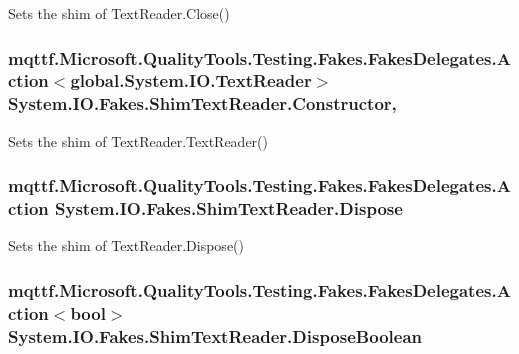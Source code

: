 Sets the shim of Text\-Reader.\-Close()

\hypertarget{class_system_1_1_i_o_1_1_fakes_1_1_shim_text_reader_a89c4d79eb1dcfe91f73276d137d9e68d}{
\subsubsection[{Constructor}]{\setlength{\rightskip}{0pt plus 5cm}mqttf.\-Microsoft.\-Quality\-Tools.\-Testing.\-Fakes.\-Fakes\-Delegates.\-Action$<$global.\-System.\-I\-O.\-Text\-Reader$>$ System.\-I\-O.\-Fakes.\-Shim\-Text\-Reader.\-Constructor\hspace{0.3cm}{\ttfamily [static]}, {\ttfamily [set]}}}\label{class_system_1_1_i_o_1_1_fakes_1_1_shim_text_reader_a89c4d79eb1dcfe91f73276d137d9e68d}


Sets the shim of Text\-Reader.\-Text\-Reader()

\hypertarget{class_system_1_1_i_o_1_1_fakes_1_1_shim_text_reader_ada6a130756159fc9f4e7c2239f70b67f}{
\subsubsection[{Dispose}]{\setlength{\rightskip}{0pt plus 5cm}mqttf.\-Microsoft.\-Quality\-Tools.\-Testing.\-Fakes.\-Fakes\-Delegates.\-Action System.\-I\-O.\-Fakes.\-Shim\-Text\-Reader.\-Dispose\hspace{0.3cm}{\ttfamily [set]}}}\label{class_system_1_1_i_o_1_1_fakes_1_1_shim_text_reader_ada6a130756159fc9f4e7c2239f70b67f}


Sets the shim of Text\-Reader.\-Dispose()

\hypertarget{class_system_1_1_i_o_1_1_fakes_1_1_shim_text_reader_a10c06efc299cea38ced4d6a8924434bc}{
\subsubsection[{Dispose\-Boolean}]{\setlength{\rightskip}{0pt plus 5cm}mqttf.\-Microsoft.\-Quality\-Tools.\-Testing.\-Fakes.\-Fakes\-Delegates.\-Action$<$bool$>$ System.\-I\-O.\-Fakes.\-Shim\-Text\-Reader.\-Dispose\-Boolean\hspace{0.3cm}{\ttfamily [set]}}}\label{class_system_1_1_i_o_1_1_fakes_1_1_shim_text_reader_a10c06efc299cea38ced4d6a8924434bc}


